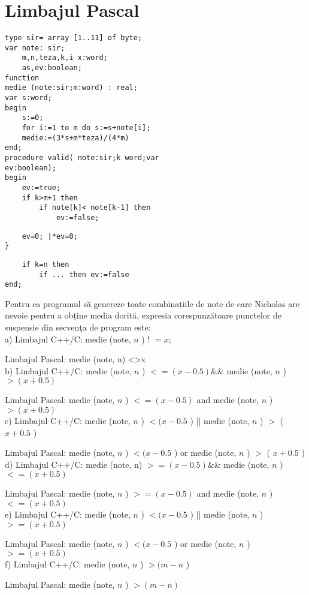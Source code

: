 \section*{Limbajul Pascal}
\begin{verbatim}
type sir= array [1..11] of byte;
var note: sir;
    m,n,teza,k,i x:word;
    as,ev:boolean;
function
medie (note:sir;m:word) : real;
var s:word;
begin
    s:=0;
    for i:=1 to m do s:=s+note[i];
    medie:=(3*s+m*teza)/(4*m)
end;
procedure valid( note:sir;k word;var
ev:boolean);
begin
    ev:=true;
    if k>m+1 then
        if note[k]< note[k-1] then
            ev:=false;
\end{verbatim}

\begin{verbatim}
    ev=0; |*ev=0;
}
\end{verbatim}

\begin{verbatim}
    if k=n then
        if ... then ev:=false
end;
\end{verbatim}

Pentru ca programul să genereze toate combinațiile de note de care Nicholas are nevoie pentru a obține media dorită, expresia corespunzătoare punctelor de suspensie din secvenţa de program este:\\
a) Limbajul C++/C: medie (note, $n$ ) ! $=x$;

Limbajul Pascal: medie (note, n) <>x\\
b) Limbajul C++/C: medie (note, $n$ ) $<=(x-0.5) \& \&$ medie (note, $n$ ) $>(x+0.5)$

Limbajul Pascal: medie (note, $n$ ) $<=(x-0.5)$ and medie (note, $n$ ) $>(x+0.5)$\\
c) Limbajul C++/C: medie (note, $n$ ) $<(x-0.5$ ) || medie (note, $n$ ) $>$ ( $x+0.5$ )

Limbajul Pascal: medie (note, $n$ ) $<(x-0.5$ ) or medie (note, $n$ ) $>$ ( $x+0.5$ )\\
d) Limbajul C++/C: medie (note, n) $>=(x-0.5) \& \&$ medie (note, $n$ ) $<=(x+0.5)$

Limbajul Pascal: medie (note, $n$ ) $>=(x-0.5)$ and medie (note, $n$ ) $<=(x+0.5)$\\
e) Limbajul C++/C: medie (note, $n$ ) $<(x-0.5$ ) || medie (note, $n$ ) $>=(x+0.5)$

Limbajul Pascal: medie (note, $n$ ) $<(x-0.5$ ) or medie (note, $n$ ) $>=(x+0.5)$\\
f) Limbajul C++/C: medie (note, $n$ ) $>(m-n$ )

Limbajul Pascal: medie (note, $n$ ) $>(m-n)$

